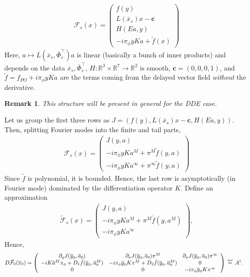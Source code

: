\documentclass[10pt]{article}
\newcommand{\bydef}{\,\stackrel{\mbox{\tiny\textnormal{\raisebox{0ex}[0ex][0ex]{def}}}}{=}\,}
\newcommand{\R}{\mathbb{R}}
\newtheorem{remark}[rem]{Remark}
\begin{document}
\begin{align*}
\mathcal{F}_s(x)=\left(\begin{array}{c}f(y)\\ L(\overline x_s)x - \mathbf{c}\\ H(Ea,y)\\ -i\pi_\phi yKa + \tilde f(x)  \end{array}\right)
\end{align*}
Here, $a\mapsto L(\overline x_s,\overline\Phi_s^\intercal)a$ is linear (basically a bunch of inner products) and depends on the data $\overline x_s,\overline\Phi_s^\intercal$, $H:\R^3\times\R^7\rightarrow\R^2$ is smooth, $\mathbf{c}=(0,0,0,1)$, and $\tilde f = f_{PO}+i\pi_\phi yKa$ are the terms coming from the delayed vector field \emph{without} the derivative.
\begin{remark}
This structure will be present in general for the DDE case.
\end{remark}
Let us group the first three rows as $J = (f(y), L(\overline x_s)x - \mathbf{c}, H(Ea,y))$. Then, splitting Fourier modes into the finite and tail parts,
\begin{align*}
\mathcal{F}_s(x)=\left(\begin{array}{c}J(y,a)\\ -i\pi_\phi yKa^M + \pi^M\tilde f(y,a)\\ -i\pi_\phi yKa^\infty + \pi^\infty\tilde f(y,a)  \end{array}\right)
\end{align*}
Since $\tilde f$ is polynomial, it is bounded. Hence, the last row is asymptotically (in Fourier mode) dominated by the differentiation operator $K$. Define an approximation
\begin{align*}
\tilde{\mathcal{F}}_s(x)=\left(\begin{array}{c}J(y,a)\\ -i\pi_\phi yKa^M + \pi^M\tilde f(y,a^M) \\ -i\pi_\phi y Ka^\infty  \end{array}\right),
\end{align*}
Hence, 
\begin{align*}
D\tilde{\mathcal{F}}_0(\overline x_0)&=\left(\begin{array}{ccc}
\partial_y J(\overline y_0,\overline a_0) & \partial_a J(\overline y_0,\overline a_0)\pi^M & \partial_a J(\overline y_0,\overline a_0)\pi^\infty \\ 
-iK\overline a^M\pi_\phi + D_1\tilde f(\overline y_0,\overline a_0^M) & -i\pi_\phi\overline y_0 K\pi^M + D_2\tilde f(\overline y_0,\overline a_0^M) & 0\\
0&0&-i\pi_\phi\overline y_0 K\pi^\infty \end{array}\right)\bydef A^\dagger.
\end{align*}
\end{document}
